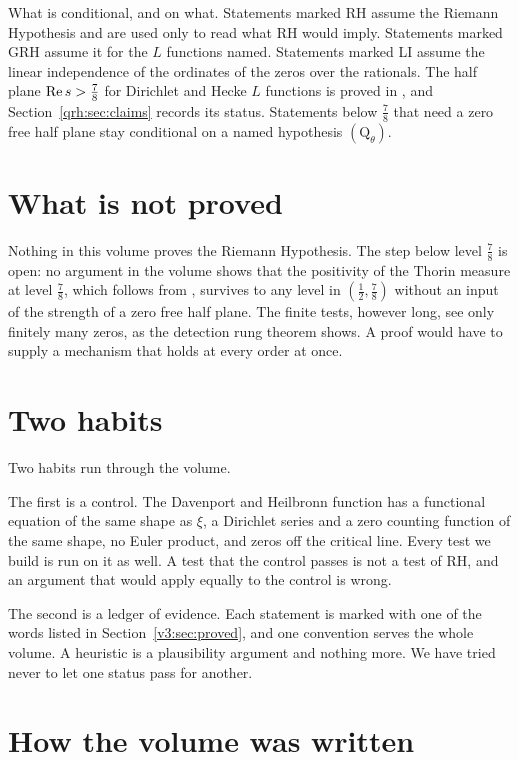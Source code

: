 What is conditional, and on what. Statements marked RH assume the Riemann Hypothesis and are used only to read what RH would imply. Statements marked GRH assume it for the $L$ functions named. Statements marked LI assume the linear independence of the ordinates of the zeros over the rationals. The half plane $\operatorname{Re} s>\frac78$ for Dirichlet and Hecke $L$ functions is proved in \cite{OAI26a}, and Section~\ref{qrh:sec:claims} records its status. Statements below $\frac78$ that need a zero free half plane stay conditional on a named hypothesis $(\mathrm Q_\theta)$.

\section{What is not proved}\label{v3:sec:notproved}

Nothing in this volume proves the Riemann Hypothesis. The step below level $\frac78$ is open: no argument in the volume shows that the positivity of the Thorin measure at level $\frac78$, which follows from \cite{OAI26a}, survives to any level in $(\frac12,\frac78)$ without an input of the strength of a zero free half plane. The finite tests, however long, see only finitely many zeros, as the detection rung theorem shows. A proof would have to supply a mechanism that holds at every order at once.

\section{Two habits}\label{v3:sec:habits}

Two habits run through the volume.

The first is a control. The Davenport and Heilbronn function has a functional equation of the same shape as $\xi$, a Dirichlet series and a zero counting function of the same shape, no Euler product, and zeros off the critical line. Every test we build is run on it as well. A test that the control passes is not a test of RH, and an argument that would apply equally to the control is wrong.

The second is a ledger of evidence. Each statement is marked with one of the words listed in Section~\ref{v3:sec:proved}, and one convention serves the whole volume. A heuristic is a plausibility argument and nothing more. We have tried never to let one status pass for another.

\section{How the volume was written}\label{v3:sec:written}

